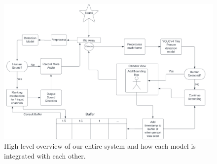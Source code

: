 \documentclass{article}
\begin{document}
\begin{figure}[ht]
\begin{center}
\centerline{\includegraphics[width=\columnwidth]{full_diagram}}
\caption{High level overview of our entire system and how each model is integrated with each other.}
\end{center}
\end{figure}
\end{document}
